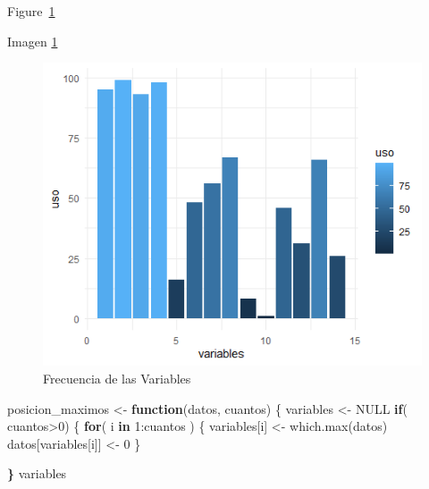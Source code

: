 \documentclass[
  a4paper,
  DIV=11,
  numbers=noendperiod]{scrreprt}
\newenvironment{Shaded}{\begin{snugshade}}{\end{snugshade}}
\newcommand{\ConstantTok}[1]{\textcolor[rgb]{0.00,0.00,0.00}{#1}}
\newcommand{\ControlFlowTok}[1]{\textcolor[rgb]{0.13,0.29,0.53}{\textbf{#1}}}
\newcommand{\DecValTok}[1]{\textcolor[rgb]{0.00,0.00,0.81}{#1}}
\newcommand{\ErrorTok}[1]{\textcolor[rgb]{0.64,0.00,0.00}{\textbf{#1}}}
\newcommand{\FunctionTok}[1]{\textcolor[rgb]{0.00,0.00,0.00}{#1}}
\newcommand{\NormalTok}[1]{\textcolor[rgb]{0.00,0.00,0.00}{#1}}
\newcommand{\OtherTok}[1]{\textcolor[rgb]{0.56,0.35,0.01}{#1}}
\newcommand{\SpecialCharTok}[1]{\textcolor[rgb]{0.00,0.00,0.00}{#1}}
\begin{document}
Figure~\ref{fig-frecuencia_variables}

Imagen \ref{fig-frecuencia_variables}

\begin{figure}

{\centering \includegraphics{imagenes/capitulo3/frecuencia_variables.png}

}

\caption{\label{fig-frecuencia_variables}Frecuencia de las Variables}

\end{figure}

\begin{Shaded}
\begin{Highlighting}[numbers=left,,]
\NormalTok{posicion\_maximos }\OtherTok{\textless{}{-}} \ControlFlowTok{function}\NormalTok{(datos, cuantos) \{ variables }\OtherTok{\textless{}{-}} \ConstantTok{NULL} \ControlFlowTok{if}\NormalTok{( cuantos}\SpecialCharTok{\textgreater{}}\DecValTok{0}\NormalTok{) \{ }\ControlFlowTok{for}\NormalTok{( i }\ControlFlowTok{in} \DecValTok{1}\SpecialCharTok{:}\NormalTok{cuantos ) \{ variables[i] }\OtherTok{\textless{}{-}} \FunctionTok{which.max}\NormalTok{(datos) datos[variables[i]] }\OtherTok{\textless{}{-}} \DecValTok{0}\NormalTok{ \}}
\end{Highlighting}
\end{Shaded}

\begin{Shaded}
\begin{Highlighting}[numbers=left,,]
\ErrorTok{\}}\NormalTok{ variables}
\end{Highlighting}
\end{Shaded}
\end{document}
